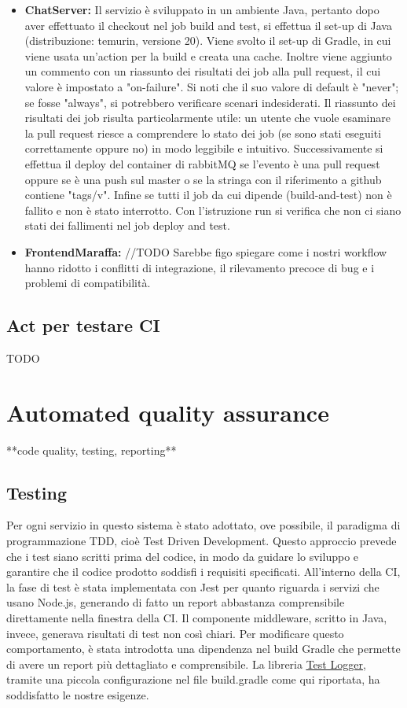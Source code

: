 \begin{itemize}
\item \textbf{ChatServer:} Il servizio è sviluppato in un ambiente Java, pertanto dopo aver effettuato il checkout nel job build and test,  si effettua il set-up di Java (distribuzione: temurin, versione 20). Viene svolto il set-up di Gradle, in cui viene usata un'action per la build e creata una cache. Inoltre viene aggiunto un commento con un riassunto dei risultati dei job  alla pull request, il cui valore è impostato a "on-failure". Si noti che il suo valore di default è "never"; se fosse "always", si potrebbero verificare scenari indesiderati. Il riassunto dei risultati dei job risulta particolarmente utile: un utente che vuole esaminare la pull request riesce a comprendere lo stato dei job (se sono stati eseguiti correttamente oppure no) in modo leggibile e intuitivo. Successivamente si effettua il deploy del container di rabbitMQ se l'evento è una pull request oppure se è una push sul master o se la stringa con il riferimento a github contiene "tags/v". Infine se tutti il job da cui dipende (build-and-test) non è fallito e non è stato interrotto. Con l'istruzione run si verifica che non ci siano stati dei fallimenti nel job deploy and test.

\item \textbf{FrontendMaraffa:} //TODO
Sarebbe figo spiegare come i nostri workflow hanno ridotto i conflitti di integrazione, il rilevamento precoce di bug e i problemi di compatibilità.

\end{itemize}
\subsection{Act per testare CI}
TODO

\section{Automated quality assurance}
**code quality, testing, reporting**
\subsection{Testing}

Per ogni servizio in questo sistema è stato adottato, ove possibile, il paradigma di programmazione TDD, cioè Test Driven Development. Questo approccio prevede che i test siano scritti prima del codice, in modo da guidare lo sviluppo e garantire che il codice prodotto soddisfi i requisiti specificati.
All'interno della CI, la fase di test è stata implementata con Jest per quanto riguarda i servizi che usano Node.js, generando di fatto un report abbastanza comprensibile direttamente nella finestra della CI. Il componente middleware, scritto in Java, invece, generava risultati di test non così chiari. Per modificare questo comportamento, è stata introdotta una dipendenza nel build Gradle che permette di avere un report più dettagliato e comprensibile. 
La libreria \href{https://plugins.gradle.org/plugin/com.adarshr.test-logger}{\underline{Test Logger}}, tramite una piccola configurazione nel file build.gradle come qui riportata, ha soddisfatto le nostre esigenze.


